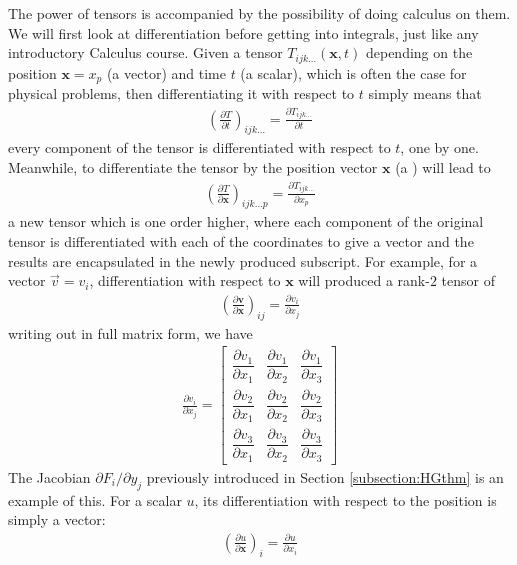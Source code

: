 The power of tensors is accompanied by the possibility of doing calculus on them. We will first look at differentiation before getting into integrals, just like any introductory Calculus course. Given a tensor $T_{ijk\ldots}(\textbf{x}, t)$ depending on the position $\textbf{x} = x_p$ (a vector) and time $t$ (a scalar), which is often the case for physical problems, then differentiating it with respect to $t$ simply means that
\begin{align}
\left(\frac{\partial T}{\partial t}\right)_{ijk\ldots} = \frac{\partial T_{ijk\ldots}}{\partial t}
\end{align}
every component of the tensor is differentiated with respect to $t$, one by one. Meanwhile, to differentiate the tensor by the position vector $\textbf{x}$ (a ) will lead to
\begin{align}
\left(\frac{\partial T}{\partial \textbf{x}}\right)_{ijk\ldots p} = \frac{\partial T_{ijk\ldots}}{\partial x_p}
\end{align}
a new tensor which is one order higher, where each component of the original tensor is differentiated with each of the coordinates to give a vector and the results are encapsulated in the newly produced subscript. For example, for a vector $\vec{v} = v_i$, differentiation with respect to $\textbf{x}$ will produced a rank-$2$ tensor of
\begin{align}
\left(\frac{\partial \textbf{v}}{\partial \textbf{x}}\right)_{ij} = \frac{\partial v_i}{\partial x_j} \label{eqn:vectortensdiff}
\end{align}
writing out in full matrix form, we have
\begin{align}
\frac{\partial v_i}{\partial x_j} = 
\begin{bmatrix}
\dfrac{\partial v_1}{\partial x_1} & \dfrac{\partial v_1}{\partial x_2} & \dfrac{\partial v_1}{\partial x_3} \\[10pt]
\dfrac{\partial v_2}{\partial x_1} & \dfrac{\partial v_2}{\partial x_2} & \dfrac{\partial v_2}{\partial x_3} \\[10pt]
\dfrac{\partial v_3}{\partial x_1} & \dfrac{\partial v_3}{\partial x_2} & \dfrac{\partial v_3}{\partial x_3} 
\end{bmatrix}
\end{align}
The Jacobian $\partial F_i/\partial y_j$ previously introduced in Section \ref{subsection:HGthm} is an example of this. For a scalar $u$, its differentiation with respect to the position is simply a vector:
\begin{align}
\left(\frac{\partial u}{\partial \textbf{x}}\right)_i = \frac{\partial u}{\partial x_i}
\end{align}
